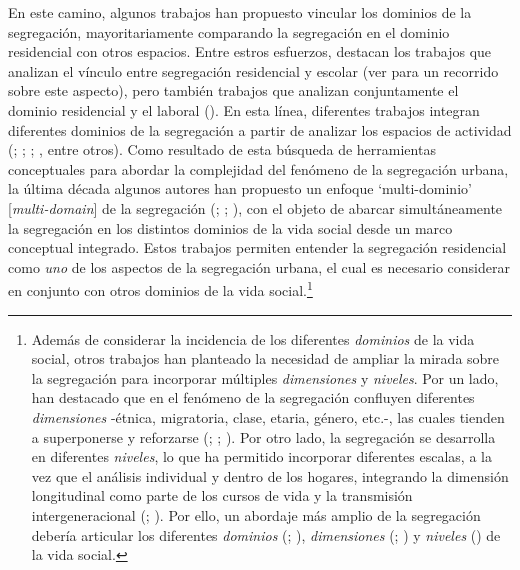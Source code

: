 \documentclass[
  spanish,
  a4paper,%
  chapterprefix=true,%
  DIV=calc,%
  twoside]{scrbook}%
\begin{document}
En este camino, algunos trabajos han propuesto vincular los dominios de
la segregación, mayoritariamente comparando la segregación en el dominio
residencial con otros espacios. Entre estros esfuerzos, destacan los
trabajos que analizan el vínculo entre segregación residencial y escolar
(ver  para un recorrido sobre este aspecto), pero también
trabajos que analizan conjuntamente el dominio residencial y el laboral
(). En esta línea, diferentes trabajos integran diferentes
dominios de la segregación a partir de analizar los espacios de
actividad (; ; ; , entre otros).
Como resultado de esta búsqueda de herramientas conceptuales para
abordar la complejidad del fenómeno de la segregación urbana, la última
década algunos autores han propuesto un enfoque `multi-dominio'
{[}\emph{multi-domain}{]} de la segregación (; ; ), con el objeto de abarcar simultáneamente la segregación en
los distintos dominios de la vida social desde un marco conceptual
integrado. Estos trabajos permiten entender la segregación residencial
como \emph{uno} de los aspectos de la segregación urbana, el cual es
necesario considerar en conjunto con otros dominios de la vida
social.\footnote{Además de considerar la incidencia de los
  diferentes \emph{dominios} de la vida social, otros trabajos han
  planteado la necesidad de ampliar la mirada sobre la segregación
  para incorporar múltiples \emph{dimensiones} y \emph{niveles}. Por un lado,
  han destacado que en el fenómeno de la segregación confluyen
  diferentes \emph{dimensiones} -étnica, migratoria, clase, etaria, género,
  etc.-, las cuales tienden a superponerse y reforzarse
  (; ; ). Por otro lado, la
  segregación se desarrolla en diferentes \emph{niveles}, lo que ha
  permitido incorporar diferentes escalas, a la vez que el análisis
  individual y dentro de los hogares, integrando la dimensión
  longitudinal como parte de los cursos de vida y la transmisión
  intergeneracional (; ). Por ello, un abordaje
  más amplio de la segregación debería articular los diferentes
  \emph{dominios} (; ), \emph{dimensiones}
  (; ) y \emph{niveles} () de la vida
  social.}
\end{document}
